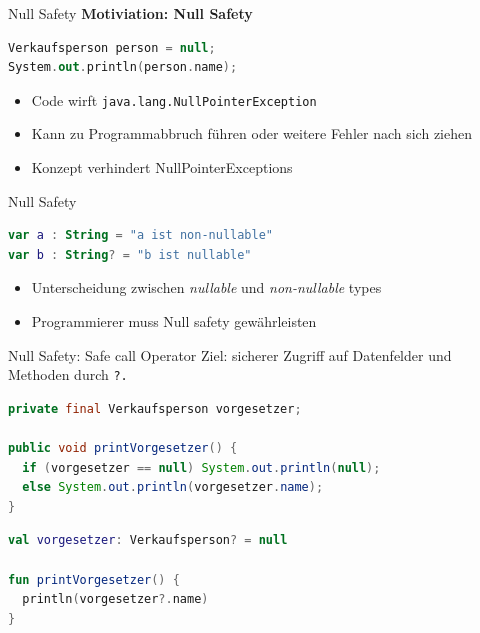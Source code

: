 \documentclass{beamer}
\begin{document}



\begin{frame}[fragile]{Null Safety}
  \textbf{Motiviation: Null Safety}
  \pause\vspace{0.5cm}
  \begin{lstlisting}[language=Kotlin, title=Java Beispiel, xleftmargin=1em]
Verkaufsperson person = null;
System.out.println(person.name);
  \end{lstlisting}
  \pause\vspace{1cm}
  \begin{itemize}[<+->]
    \item Code wirft \texttt{java.lang.NullPointerException}
    \item Kann zu Programmabbruch führen oder weitere Fehler nach sich ziehen
    \item Konzept verhindert NullPointerExceptions
  \end{itemize}
\end{frame}

\begin{frame}[fragile]{Null Safety}
  \begin{lstlisting}[language=Kotlin]
var a : String = "a ist non-nullable"
var b : String? = "b ist nullable"
  \end{lstlisting}
  \pause \vspace{1cm}
  \begin{itemize}[<+->]
    \item Unterscheidung zwischen \textit{nullable} und \textit{non-nullable} types
    \item Programmierer muss Null safety gewährleisten
  \end{itemize}
\end{frame}

\begin{frame}[fragile]{Null Safety: Safe call Operator}
  Ziel: sicherer Zugriff auf Datenfelder und Methoden durch \texttt{?.}
  \pause
  \begin{lstlisting}[language=Java, title=in Java]
private final Verkaufsperson vorgesetzer;

public void printVorgesetzer() {
  if (vorgesetzer == null) System.out.println(null);
  else System.out.println(vorgesetzer.name);
}
  \end{lstlisting}
  \pause
  \begin{lstlisting}[language=Kotlin, title=in Kotlin]
val vorgesetzer: Verkaufsperson? = null

fun printVorgesetzer() {
  println(vorgesetzer?.name)
} 
  \end{lstlisting}
\end{frame}
\end{document}
